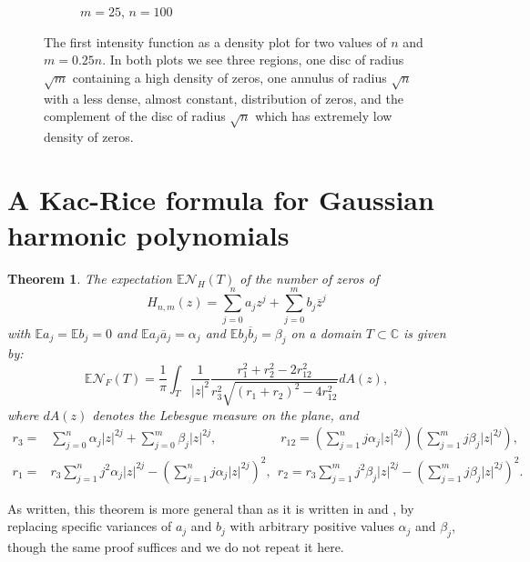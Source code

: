 \documentclass[12pt]{amsart}
\newtheorem{theorem}{Theorem}
\theoremstyle{remark}
\begin{document}
\begin{figure}[h]
\begin{subfigure}[b]{.35\textwidth}
		\caption{$m=25$, $n=100$}
	\end{subfigure}
	\caption{The first intensity function as a density plot for two values of $n$ 	and $m=0.25n$.  In both plots we see three regions, one disc of radius $\sqrt{m}$ containing a high density of zeros, one annulus of radius $\sqrt{n}$ with a less dense, almost constant, distribution of zeros, and the complement of the disc of radius $\sqrt{n}$ which has extremely low density of zeros.}
	\label{denistyPlots}
\end{figure}

\section{A Kac-Rice formula for Gaussian harmonic polynomials}
\begin{theorem}\label{thmLiWeiGeneral}
	The expectation $\mathbb{E}\mathcal{N}_H(T)$ of the number of zeros of 
	\[H_{n,m}(z)=\sum_{j=0}^na_jz^j+\sum_{j=0}^mb_j\overline{z}^j\]
	with $\mathbb{E}a_j=\mathbb{E}b_j=0$ and 
	$\mathbb{E}a_j\overline{a}_j=\alpha_j$ and 
	$\mathbb{E}b_j\overline{b}_j=\beta_j$ on a domain 
	$T\subset\mathbb{C}$ is given by:
	\begin{equation}
		\label{LiWeiGeneral}
		\mathbb{E}\mathcal{N}_F(T)=\frac{1}{\pi}\int_T\frac{1}{\lvert z\rvert^2}
		\frac{r_1^2+r_2^2-2r_{12}^2}{r_3^2\sqrt{(r_1+r_2)^2-4r_{12}^2}}dA(z),
	\end{equation}
	where $dA(z)$ denotes the Lebesgue measure on the plane, and
	\begin{align*}
		r_3=&\sum_{j=0}^n\alpha_j\lvert z\rvert^{2j}
		+\sum_{j=0}^m\beta_j\lvert z\rvert^{2j},\qquad\qquad\quad 
		r_{12}=\left(\sum_{j=1}^nj\alpha_j\lvert z\rvert^{2j}\right)
		\left(\sum_{j=1}^mj\beta_j\lvert z\rvert^{2j}\right),
		\\r_1=&r_3\sum_{j=1}^nj^2\alpha_j\lvert z\rvert^{2j}
		-\left(\sum_{j=1}^nj\alpha_j\lvert z\rvert^{2j}\right)^2,\ \ 
		r_2=r_3\sum_{j=1}^mj^2\beta_j\lvert z\rvert^{2j}
		-\left(\sum_{j=1}^mj\beta_j\lvert z\rvert^{2j}\right)^2.
	\end{align*}
\end{theorem}
	As written, this theorem is more general than as it is written in \cite{LiWei} and \cite{Lundberg}, by replacing specific variances of $a_j$ and $b_j$ with arbitrary positive values $\alpha_j$ and $\beta_j$, though the same proof suffices and we do not repeat it here.
\end{document}

